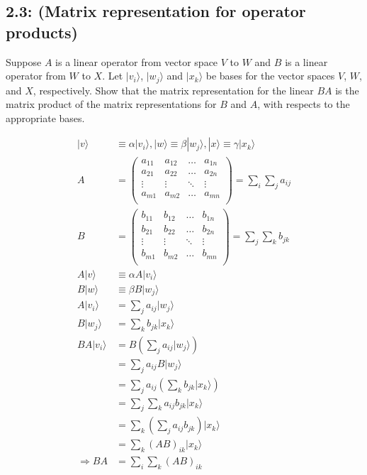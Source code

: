 \documentclass{article}
\begin{document}
\subsection{2.3: (Matrix representation for operator products)}

Suppose $A$ is a linear operator from vector space $V$ to $W$ and $B$ is a linear
operator from $W$ to $X$. Let $|v_i\rangle$, $|w_j\rangle$ and $|x_k\rangle$ be
bases for the vector spaces $V$, $W$, and $X$, respectively. Show that the matrix 
representation for the linear $BA$ is the matrix product of the matrix representations for $B$ and $A$,
with respects to the appropriate bases.

\begin{equation}
    \begin{split}
        |v\rangle & \equiv \alpha|v_i\rangle,
        |w\rangle \equiv \beta|w_j\rangle,
        |x\rangle \equiv \gamma|x_k\rangle \\
        A & = \begin{pmatrix}
            a_{11} & a_{12} & \dots & a_{1n} \\
            a_{21} & a_{22} & \dots & a_{2n} \\
            \vdots & \vdots & \ddots & \vdots \\
            a_{m1} & a_{m2} & \dots & a_{mn} \\
        \end{pmatrix} = \sum_{i}^{} \sum_{j}^{} a_{ij} \\
        B & = \begin{pmatrix}
            b_{11} & b_{12} & \dots & b_{1n} \\
            b_{21} & b_{22} & \dots & b_{2n} \\
            \vdots & \vdots & \ddots & \vdots \\
            b_{m1} & b_{m2} & \dots & b_{mn} \\
        \end{pmatrix} = \sum_{j}^{} \sum_{k}^{} b_{jk} \\
        A|v\rangle & \equiv \alpha A|v_i\rangle \\
        B|w\rangle & \equiv \beta B|w_j\rangle \\
        A|v_i\rangle & = \sum_{j}^{} a_{ij}|w_j\rangle \\
        B|w_j\rangle & = \sum_{k}^{} b_{jk}|x_k\rangle \\
        BA|v_i\rangle & = B(\sum_{j}^{} a_{ij}|w_j\rangle) \\
        & = \sum_{j}^{} a_{ij}B|w_j\rangle \\
        & = \sum_{j}^{} a_{ij}(\sum_{k}^{} b_{jk}|x_k\rangle) \\
        & = \sum_{j}^{} \sum_{k}^{} a_{ij}b_{jk}|x_k\rangle \\
        & = \sum_{k}^{} (\sum_{j}^{} a_{ij}b_{jk})|x_k\rangle \\
        & = \sum_{k}^{} (AB)_{ik}|x_k\rangle \\
        \Longrightarrow BA & = \sum_{i}^{} \sum_{k}^{} (AB)_{ik} \\
    \end{split}
\end{equation}
\end{document}

